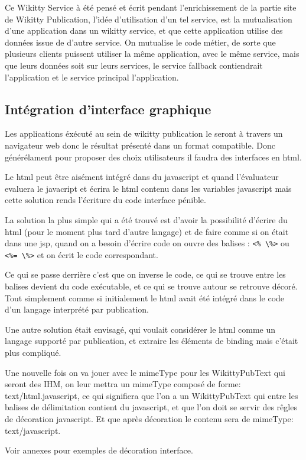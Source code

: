Ce Wikitty Service à été pensé et écrit pendant l'enrichissement de la partie 
site de Wikitty Publication, l'idée d'utilisation d'un tel service, est la 
mutualisation d'une application dans un wikitty service, et que cette 
application utilise des données issue de d'autre service. On mutualise le code 
métier, de sorte que plusieurs clients puissent utiliser la même application, 
avec le même service, mais que leurs données soit sur leurs services, 
le service fallback contiendrait l'application et le service principal 
l'application.

\subsection{Intégration d'interface graphique}

Les applications éxécuté au sein de wikitty publication le seront à travers 
un navigateur web donc le résultat présenté dans un format compatible.
Donc générélament pour proposer des choix utilisateurs il faudra des interfaces
en html.

Le html peut être aisément intégré dans du javascript et quand l'évaluateur
evaluera le javacript et écrira le html contenu dans les variables javascript
mais cette solution rends l'écriture du code interface pénible.

La solution la plus simple qui a été trouvé est d'avoir la possibilité d'écrire 
du html (pour le moment plus tard d'autre langage) et de faire comme si on était
dans une jsp, quand on a besoin d'écrire code on ouvre des balises : \verb!<% \%>!
ou \verb!<%= \%>! et on écrit le code correspondant.

Ce qui se passe derrière c'est que on inverse le code, ce qui se trouve entre
les balises devient du code exécutable, et ce qui se trouve autour se retrouve
décoré. Tout simplement comme si initialement le html avait été intégré dans
le code d'un langage interprété par publication.

Une autre solution était envisagé, qui voulait considérer le html comme un langage
supporté par publication, et extraire les éléments de binding mais c'était plus 
compliqué.

Une nouvelle fois on va jouer avec le mimeType pour les WikittyPubText qui 
seront des IHM, on leur mettra un mimeType composé de forme: text/html.javascript,
ce qui signifiera que l'on a un WikittyPubText qui entre les balises de délimitation
contient du javascript, et que l'on doit se servir des rêgles de décoration javascript.
Et que après décoration le contenu sera de mimeType: text/javascript.

Voir annexes pour exemples de décoration interface.
